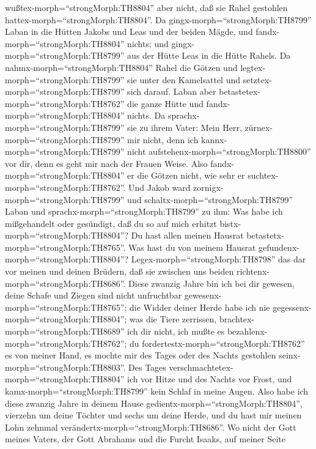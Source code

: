 wußtex-morph=``strongMorph:TH8804'' aber nicht, daß sie Rahel gestohlen
hattex-morph=``strongMorph:TH8804''.  Da
gingx-morph=``strongMorph:TH8799'' Laban in die Hütten Jakobs und Leas
und der beiden Mägde, und fandx-morph=``strongMorph:TH8804'' nichts; und
gingx-morph=``strongMorph:TH8799'' aus der Hütte Leas in die Hütte
Rahels.  Da nahmx-morph=``strongMorph:TH8804'' Rahel die
Götzen und legtex-morph=``strongMorph:TH8799'' sie unter den Kamelsattel
und setztex-morph=``strongMorph:TH8799'' sich darauf. Laban aber
betastetex-morph=``strongMorph:TH8762'' die ganze Hütte und
fandx-morph=``strongMorph:TH8804'' nichts.  Da
sprachx-morph=``strongMorph:TH8799'' sie zu ihrem Vater: Mein Herr,
zürnex-morph=``strongMorph:TH8799'' mir nicht, denn ich
kannx-morph=``strongMorph:TH8799'' nicht
aufstehenx-morph=``strongMorph:TH8800'' vor dir, denn es geht mir nach
der Frauen Weise. Also fandx-morph=``strongMorph:TH8804'' er die Götzen
nicht, wie sehr er suchtex-morph=``strongMorph:TH8762''. 
Und Jakob ward zornigx-morph=``strongMorph:TH8799'' und
schaltx-morph=``strongMorph:TH8799'' Laban und
sprachx-morph=``strongMorph:TH8799'' zu ihm: Was habe ich mißgehandelt
oder gesündigt, daß du so auf mich erhitzt
bistx-morph=``strongMorph:TH8804''?  Du hast allen meinen
Hausrat betastetx-morph=``strongMorph:TH8765''. Was hast du von meinem
Hausrat gefundenx-morph=``strongMorph:TH8804''?
Legex-morph=``strongMorph:TH8798'' das dar vor meinen und deinen
Brüdern, daß sie zwischen uns beiden
richtenx-morph=``strongMorph:TH8686''.  Diese zwanzig Jahre
bin ich bei dir gewesen, deine Schafe und Ziegen sind nicht unfruchtbar
gewesenx-morph=``strongMorph:TH8765''; die Widder deiner Herde habe ich
nie gegessenx-morph=``strongMorph:TH8804'';  was die Tiere
zerrissen, brachtex-morph=``strongMorph:TH8689'' ich dir nicht, ich
mußte es bezahlenx-morph=``strongMorph:TH8762''; du
fordertestx-morph=``strongMorph:TH8762'' es von meiner Hand, es mochte
mir des Tages oder des Nachts gestohlen
seinx-morph=``strongMorph:TH8803''.  Des Tages
verschmachtetex-morph=``strongMorph:TH8804'' ich vor Hitze und des
Nachts vor Frost, und kamx-morph=``strongMorph:TH8799'' kein Schlaf in
meine Augen.  Also habe ich diese zwanzig Jahre in deinem
Hause gedientx-morph=``strongMorph:TH8804'', vierzehn um deine Töchter
und sechs um deine Herde, und du hast mir meinen Lohn zehnmal
verändertx-morph=``strongMorph:TH8686''.  Wo nicht der Gott
meines Vaters, der Gott Abrahams und die Furcht Isaaks, auf meiner Seite
